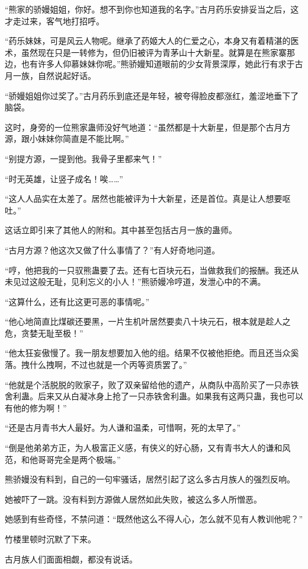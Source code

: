 \begin{this_body}
“熊家的骄嫚姐姐，你好。想不到你也知道我的名字。”古月药乐安排妥当之后，这才走过来，客气地打招呼。

“药乐妹妹，可是风云人物呢。继承了药姬大人的仁爱之心，本身又有着精湛的医术，虽然现在只是一转修为，但仍旧被评为青茅山十大新星。就算是在熊家寨那边，也有许多人仰慕妹妹你呢。”熊骄嫚知道眼前的少女背景深厚，她此行有求于古月一族，自然说起好话。

“骄嫚姐姐你过奖了。”古月药乐到底还是年轻，被夸得脸皮都涨红，羞涩地垂下了脑袋。

这时，身旁的一位熊家蛊师没好气地道：“虽然都是十大新星，但是那个古月方源，跟小妹妹你简直是不能比啊。”

“别提方源，一提到他。我骨子里都来气！”

“时无英雄，让竖子成名！唉……”

“这人人品实在太差了。居然也能被评为十大新星，还是首位。真是让人想要呕吐。”

这话立即引来了其他人的附和。其中甚至包括古月一族的蛊师。

“古月方源？他这次又做了什么事情了？”有人好奇地问道。

“哼，他把我的一只驭熊蛊要了去。还有七百块元石，当做救我们的报酬。我还从未见过这般无耻，见利忘义的小人！”熊骄嫚冷哼道，发泄心中的不满。

“这算什么，还有比这更可恶的事情呢。”

“他心地简直比煤碳还要黑，一片生机叶居然要卖八十块元石，根本就是趁人之危，贪婪无耻至极！”

“他太狂妄傲慢了。我一朋友想要加入他的组。结果不仅被他拒绝。而且还当众奚落。拽什么拽啊，不过也就是一个丙等资质罢了。”

“他就是个活脱脱的败家子，败了双亲留给他的遗产，从商队中高阶买了一只赤铁舍利蛊。后来又从白凝冰身上抢了一只赤铁舍利蛊。如果我有这两只蛊，我也可以有他的修为啊！”

“还是古月青书大人最好。为人谦和温柔，可惜啊，死的太早了。”

“倒是他弟弟方正，为人极富正义感，有侠义的好心肠，又有青书大人的谦和风范，和他哥哥完全是两个极端。”

熊骄嫚没有料到，自己的一句牢骚话，居然引起了这么多古月族人的强烈反响。

她被吓了一跳。没有料到方源做人居然如此失败，被这么多人所憎恶。

她感到有些奇怪，不禁问道：“既然他这么不得人心，怎么就不见有人教训他呢？”

竹楼里顿时沉默了下来。

古月族人们面面相觑，都没有说话。


\end{this_body}
